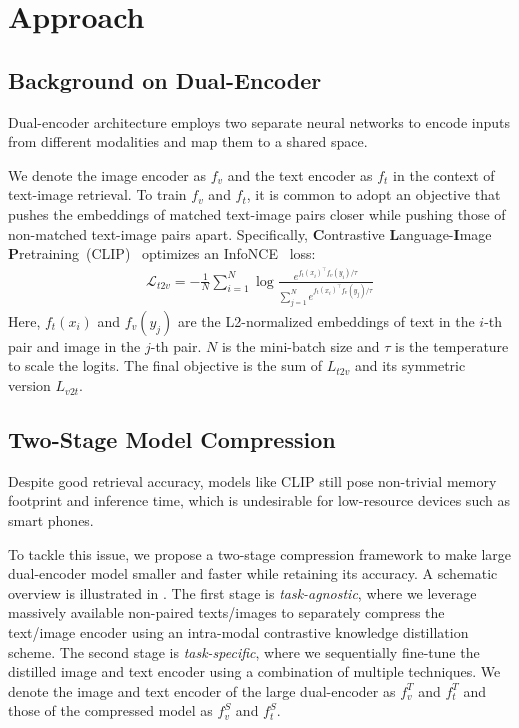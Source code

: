 \section{Approach}



\subsection{Background on Dual-Encoder}
\label{pre}
Dual-encoder architecture employs two separate neural networks to encode inputs from different modalities and map them to a shared  space. 

We denote the image encoder as $f_v$ and the text encoder as $f_t$ in the context of text-image retrieval. To train $f_v$ and $f_t$, it is common to adopt an objective that pushes the embeddings of matched text-image pairs closer while pushing those of non-matched text-image pairs apart. Specifically, \textbf{C}ontrastive \textbf{L}anguage-\textbf{I}mage \textbf{P}retraining~(CLIP)~\cite{clip} optimizes an InfoNCE~\cite{infonce} loss:
\begin{align}
	\mathcal{L}_{t2v}=-\frac{1}{N}\sum_{i=1}^{N}\log{\frac{e^{f_t(x_i)^\top f_v(y_i)/\tau}}{\sum_{j=1}^{N}e^{f_t(x_i)^\top f_v(y_j)/\tau}}}
	\label{infonce}
\end{align}
Here, $f_t(x_i)$ and $f_v(y_j)$ are the L2-normalized embeddings of text in the $i$-th pair and image in the $j$-th pair. $N$ is the mini-batch size and $\tau$ is the temperature to scale the logits. The final objective is the sum of $L_{t2v}$ and its symmetric version $L_{v2t}$.

\subsection{Two-Stage Model Compression}
\label{sec2}
Despite good retrieval accuracy, models like CLIP still pose non-trivial memory 
footprint and inference time, which is undesirable for low-resource devices 
such as smart phones. 

To tackle this issue, we propose a two-stage compression framework to make large dual-encoder model smaller and faster while retaining its accuracy. A schematic overview is illustrated in . The first stage is \textit{task-agnostic}, where we leverage massively available non-paired texts/images to separately compress the text/image encoder using an intra-modal contrastive knowledge distillation scheme. The second stage is \textit{task-specific}, where we sequentially fine-tune the distilled image and text encoder using a combination of multiple techniques. We denote the image and text encoder of the large dual-encoder as $f_v^{T}$ and $f_t^{T}$ and those of the compressed model as $f_v^{S}$ and $f_t^{S}$.

